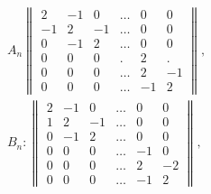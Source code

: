 \documentclass[10pt]{article}
\begin{document}
\[

\begin{aligned}

& A_{n}\left\|\begin{array}{rrrrrr}

2 & -1 & 0 & \ldots & 0 & 0 \\

-1 & 2 & -1 & \ldots & 0 & 0 \\

0 & -1 & 2 & \ldots & 0 & 0 \\

0 & 0 & 0 & . & 2 & . \\

0 & 0 & 0 & \ldots & 2 & -1 \\

0 & 0 & 0 & \ldots & -1 & 2

\end{array}\right\|, \\

& B_{n}:\left\|\begin{array}{rrrrrr}

2 & -1 & 0 & \ldots & 0 & 0 \\

1 & 2 & -1 & \ldots & 0 & 0 \\

0 & -1 & 2 & \ldots & 0 & 0 \\

0 & 0 & 0 & \ldots & -1 & 0 \\

0 & 0 & 0 & \ldots & 2 & -2 \\

0 & 0 & 0 & \ldots & -1 & 2

\end{array}\right\|,

\end{aligned}

\]
\end{document}
